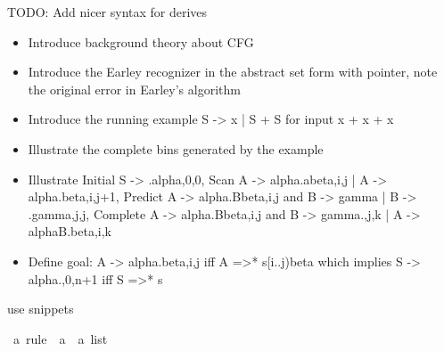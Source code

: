 %
\begin{isabellebody}%
%
%
\isadelimtheory
%
\endisadelimtheory
%
\isatagtheory
%
\endisatagtheory
{\isafoldtheory}%
%
\isadelimtheory
%
\endisadelimtheory
%
\isadelimdocument
%
\endisadelimdocument
%
\isatagdocument
%
\isamarkuptrue%
%
\endisatagdocument
{\isafolddocument}%
%
\isadelimdocument
%
\endisadelimdocument
%
\begin{isamarkuptext}%
TODO: Add nicer syntax for derives%
\end{isamarkuptext}\isamarkuptrue%
%
\begin{isamarkuptext}%
\begin{itemize}
    \item Introduce background theory about CFG
    \item Introduce the Earley recognizer in the abstract set form with pointer, note the original error in Earley's algorithm \\
    \item Introduce the running example S -> x | S + S for input x + x + x \\
    \item Illustrate the complete bins generated by the example \\
    \item Illustrate Initial S -> .alpha,0,0, Scan A -> alpha.abeta,i,j | A -> alpha.beta,i,j+1,
      Predict A -> alpha.Bbeta,i,j and B -> gamma | B -> .gamma,j,j,
      Complete A -> alpha.Bbeta,i,j and B -> gamma.,j,k | A -> alphaB.beta,i,k \\
    \item Define goal: A -> alpha.beta,i,j iff A =>* s[i..j)beta which implies S -> alpha.,0,n+1 iff S =>* s \\
  \end{itemize}%
\end{isamarkuptext}\isamarkuptrue%
%
\isadelimdocument
%
\endisadelimdocument
%
\isatagdocument
%
\isamarkuptrue%
%
\endisatagdocument
{\isafolddocument}%
%
\isadelimdocument
%
\endisadelimdocument
%
\begin{isamarkuptext}%
use snippets%
\end{isamarkuptext}\isamarkuptrue%
\isamarkupfalse%
\ {\isacharprime}{\kern0pt}a\ rule\ {\isacharequal}{\kern0pt}\ {\isachardoublequoteopen}{\isacharprime}{\kern0pt}a\ {\isasymtimes}\ {\isacharprime}{\kern0pt}a\ list{\isachardoublequoteclose}\isanewline

\end{isabellebody}
